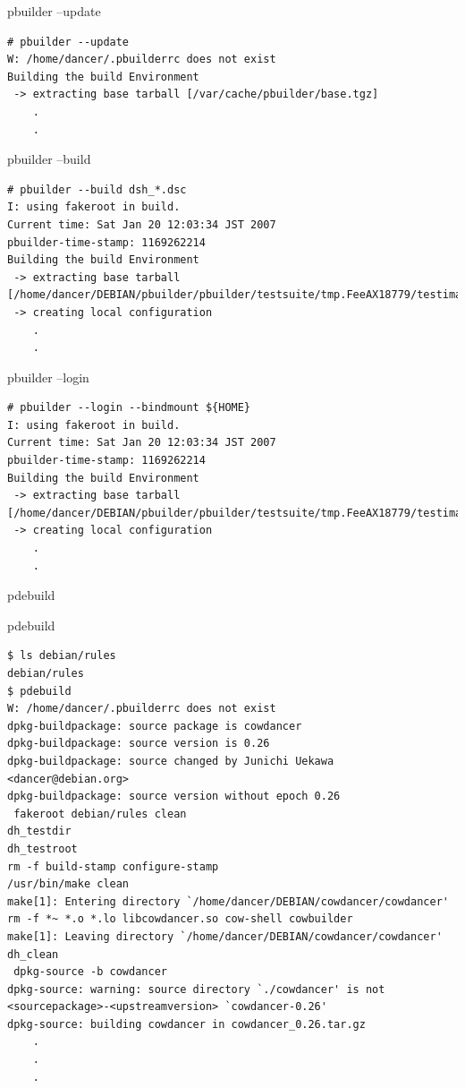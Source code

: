 \documentclass[dvipdfm,12pt,times]{beamer}
\newcommand{\emtext}[1]{
\begin{frame}{}
 
{\Huge #1
}
\end{frame}
}
\begin{document}
\begin{frame}[containsverbatim]{pbuilder --update}
\begin{verbatim}
# pbuilder --update
W: /home/dancer/.pbuilderrc does not exist
Building the build Environment
 -> extracting base tarball [/var/cache/pbuilder/base.tgz]
	.
	.
\end{verbatim}
\end{frame}

\begin{frame}[containsverbatim]{pbuilder --build}
\begin{verbatim}
# pbuilder --build dsh_*.dsc
I: using fakeroot in build.
Current time: Sat Jan 20 12:03:34 JST 2007
pbuilder-time-stamp: 1169262214
Building the build Environment
 -> extracting base tarball [/home/dancer/DEBIAN/pbuilder/pbuilder/testsuite/tmp.FeeAX18779/testimage]
 -> creating local configuration
	.
	.
\end{verbatim}
\end{frame}


\begin{frame}[containsverbatim]{pbuilder --login}
\begin{verbatim}
# pbuilder --login --bindmount ${HOME}
I: using fakeroot in build.
Current time: Sat Jan 20 12:03:34 JST 2007
pbuilder-time-stamp: 1169262214
Building the build Environment
 -> extracting base tarball [/home/dancer/DEBIAN/pbuilder/pbuilder/testsuite/tmp.FeeAX18779/testimage]
 -> creating local configuration
	.
	.
\end{verbatim}
\end{frame}

\emtext{pdebuild}

\begin{frame}[containsverbatim]{pdebuild}
\begin{verbatim}
$ ls debian/rules
debian/rules
$ pdebuild
W: /home/dancer/.pbuilderrc does not exist
dpkg-buildpackage: source package is cowdancer
dpkg-buildpackage: source version is 0.26
dpkg-buildpackage: source changed by Junichi Uekawa <dancer@debian.org>
dpkg-buildpackage: source version without epoch 0.26
 fakeroot debian/rules clean
dh_testdir
dh_testroot
rm -f build-stamp configure-stamp
/usr/bin/make clean
make[1]: Entering directory `/home/dancer/DEBIAN/cowdancer/cowdancer'
rm -f *~ *.o *.lo libcowdancer.so cow-shell cowbuilder
make[1]: Leaving directory `/home/dancer/DEBIAN/cowdancer/cowdancer'
dh_clean
 dpkg-source -b cowdancer
dpkg-source: warning: source directory `./cowdancer' is not <sourcepackage>-<upstreamversion> `cowdancer-0.26'
dpkg-source: building cowdancer in cowdancer_0.26.tar.gz
	.
	.
	.
\end{verbatim}
\end{frame}
\end{document}
